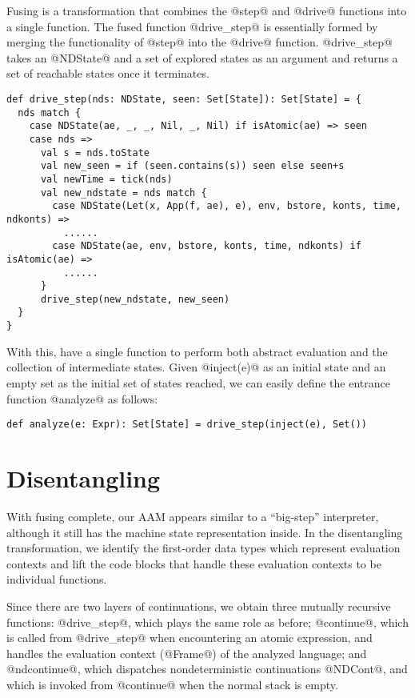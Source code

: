 \documentclass[acmsmall,review,anonymous]{acmart}\settopmatter{printfolios=true,printccs=false,printacmref=false}
\begin{document}
Fusing is a transformation that combines the @step@ and @drive@ functions into a single
function.
The fused function @drive_step@ is essentially formed by merging the functionality of
@step@ into the @drive@ function.
@drive_step@ takes an @NDState@ and a set of explored states as an argument
and returns a set of reachable states once it terminates.

\begin{lstlisting}
def drive_step(nds: NDState, seen: Set[State]): Set[State] = {
  nds match {
    case NDState(ae, _, _, Nil, _, Nil) if isAtomic(ae) => seen
    case nds =>
      val s = nds.toState
      val new_seen = if (seen.contains(s)) seen else seen+s
      val newTime = tick(nds)
      val new_ndstate = nds match {
        case NDState(Let(x, App(f, ae), e), env, bstore, konts, time, ndkonts) =>
          ......
        case NDState(ae, env, bstore, konts, time, ndkonts) if isAtomic(ae) =>
          ......
      }
      drive_step(new_ndstate, new_seen)
  }
}
\end{lstlisting}

With this, have a single function to perform both abstract evaluation and the collection of
intermediate states. Given @inject(e)@ as an initial state and an empty set as the
initial set of states reached, we can easily define the entrance function @analyze@ as
follows:

\begin{lstlisting}
def analyze(e: Expr): Set[State] = drive_step(inject(e), Set())
\end{lstlisting}

\section{Disentangling} \label{disen}

With fusing complete, our AAM
appears similar to a ``big-step'' interpreter, although it still has the machine
state representation inside.
In the disentangling transformation, we
identify the first-order data types which represent evaluation contexts
and lift the code blocks that handle these evaluation contexts to be individual functions.

Since there are two layers of continuations,
we obtain three mutually recursive functions: @drive_step@, which plays the same
role as before; @continue@, which is called from @drive_step@ when encountering an atomic expression, and handles the evaluation context (@Frame@) of the analyzed
language; and @ndcontinue@, which dispatches nondeterministic continuations @NDCont@,
and which is invoked from @continue@ when the normal stack is empty.
\end{document}

